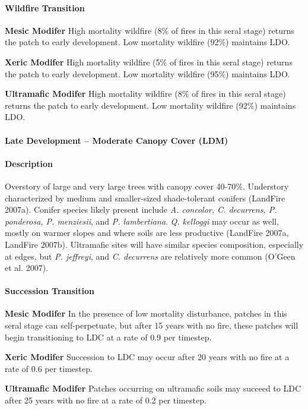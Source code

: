 \paragraph{Wildfire Transition}
\begin{adjustwidth}{2cm}{}
\textbf{Mesic Modifer } High mortality wildfire (8\% of fires in this seral stage) returns the patch to early development. Low mortality wildfire (92\%) maintains LDO.

\textbf{Xeric Modifer} High mortality wildfire (5\% of fires in this seral stage) returns the patch to early development. Low mortality wildfire (95\%) maintains LDO. 

\textbf{Ultramafic Modifer} High mortality wildfire (8\% of fires in this seral stage) returns the patch to early development. Low mortality wildfire (92\%) maintains LDO.

\end{adjustwidth}

\noindent\hrulefill

\paragraph{Late Development – Moderate Canopy Cover (LDM)}

\paragraph{Description} Overstory of large and very large trees with canopy cover 40-70\%. Understory characterized by medium and smaller-sized shade-tolerant conifers (LandFire 2007a). Conifer species likely present include \emph{A. concolor, C. decurrens, P. ponderosa, P. menziesii}, and \emph{P. lambertiana}. \emph{Q. kelloggi} may occur as well, mostly on warmer slopes and where soils are less productive (LandFire 2007a, LandFire 2007b). Ultramafic sites will have similar species composition, especially at edges, but \emph{P. jeffreyi}, and \emph{C. decurrens} are relatively more common (O’Geen et al. 2007).


\paragraph{Succession Transition} 
\begin{adjustwidth}{2cm}{}
\textbf{Mesic Modifer } In the presence of low mortality disturbance, patches in this seral stage can self-perpetuate, but after 15 years with no fire, these patches will begin transitioning to LDC at a rate of 0.9 per timestep.

\textbf{Xeric Modifer} Succession to LDC may occur after 20 years with no fire at a rate of 0.6 per timestep. 

\textbf{Ultramafic Modifer} Patches occurring on ultramafic soils may succeed to LDC after 25 years with no fire at a rate of 0.2 per timestep.

\end{adjustwidth}
